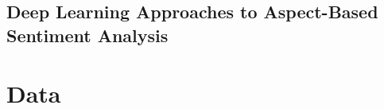 \documentclass[11pt,a4paper,titlepage]{article}
\begin{document}








\subsection{Deep Learning Approaches to Aspect-Based Sentiment Analysis}














\section{Data}
\end{document}
